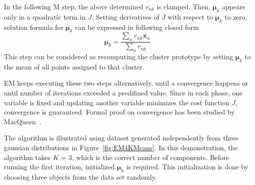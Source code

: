 In the following M step, the above determined \(r_{nk}\) is clamped. Then, \(\boldsymbol{\mu}_k\) appears only in a quadratic term in \(J\). Setting derivatives of \(J\) with respect to \(\boldsymbol{\mu}_k\) to zero, solution formula for \(\boldsymbol{\mu}_k\) can be expressed in following closed form
\begin{equation}
	\label{eq:muupdate}
	\boldsymbol{\mu}_{k} = \frac{\sum_n r_{nk}\mathbf{x}_n}{\sum_n r_{nk}}
\end{equation}
This step can be considered as recomputing the cluster prototype by setting \(\boldsymbol{\mu}_k\) to the mean of all points assigned to that cluster. 

EM keeps executing these two steps alternatively, until a convergence happens or until number of iterations exceeded a predifined value. Since in each phase, one variable is fixed and updating another variable minimizes the cost function \(J\), convergence is guaranteed. Formal proof on convergence has been studied by MacQueen~\cite{macqueen1967some}.

The algorithm is illustrated using dataset generated independently from three gaussian distributions in Figure~\ref{fig:EM4KMeans}. In this demonstration, the algorithm takes \(K\) = 3, which is the correct number of components. Before running the first iteration, initialized \(\boldsymbol{\mu}_k\) is required. This initialization is done by choosing three objects from the data set randomly.

